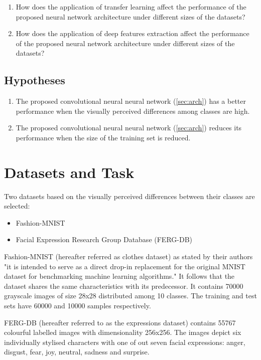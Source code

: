 \documentclass{article}
\begin{document}
\begin{enumerate}
  \item How does the application of transfer learning affect the performance of the proposed neural network architecture under different sizes of the datasets?
  \item How does the application of deep features extraction affect the performance of the proposed neural network architecture under different sizes of the datasets?
\end{enumerate}

\subsection{Hypotheses}
\label{sec:hypotheses}
\begin{enumerate}[label=\textbf{H.\arabic*}]
  \item \label{h:1} The proposed convolutional neural neural network (\ref{sec:arch}) has a better performance when the visually perceived differences among classes are high.
  \item \label{h:2} The proposed convolutional neural neural network (\ref{sec:arch}) reduces its performance when the size of the training set is reduced. 
 \end{enumerate}

\section{Datasets and Task}
\label{sec:data}

Two datasets based on the visually perceived differences between their classes are selected: 
\begin{itemize}
  \item Fashion-MNIST \citep{DBLP:journals/corr/abs-1708-07747}
  \item Facial Expression Research Group Database (FERG-DB)\citep{aneja2016modeling}
\end{itemize}

Fashion-MNIST (hereafter referred as clothes dataset) as stated by their authors "it is intended to serve as a direct drop-in replacement for the original MNIST dataset for benchmarking machine learning algorithms." It follows that the dataset shares the same characteristics with its predecessor. It contains 70000 grayscale images of size 28x28 distributed among 10 classes. The training and test sets have 60000 and 10000 samples respectively.

FERG-DB (hereafter referred to as the expressions dataset) contains 55767 colourful labelled images with dimensionality 256x256. The images depict six individually stylised characters with one of out seven facial expressions: anger, disgust, fear, joy, neutral, sadness and surprise.
\end{document}
